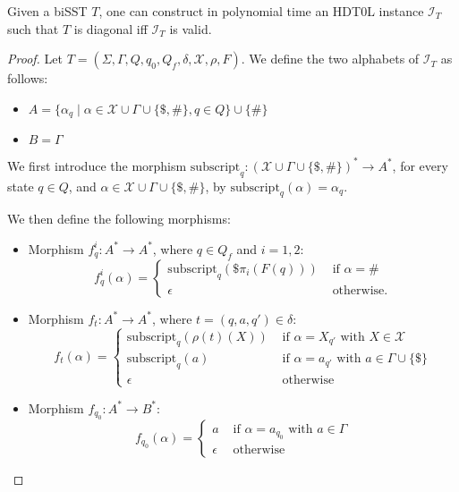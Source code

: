 \documentclass{llncs}
\newcommand{\Vars}{\mathcal{X}}
\begin{document}
\begin{lemma}
    Given a biSST $T$, one can construct in polynomial time an
    HDT0L instance $\mathcal{I}_T$ such that $T$ is diagonal iff 
    $\mathcal{I}_T$ is valid. 
\end{lemma}


\begin{proof}
Let $T = (\Sigma, \Gamma, Q, q_0, Q_f, \delta, \Vars, \rho, F)$. 
We define the two alphabets of $\mathcal{I}_T$ as follows:
\begin{itemize}
\item $A= \{ \alpha_q \mid \alpha\in\mathcal{X}\cup \Gamma \cup \{\$,\#\} , q \in Q\} \cup \{ \#\}$
\item $B=\Gamma$
\end{itemize}

We first introduce the morphism 
$\text{subscript}_q: (\mathcal{X}\cup \Gamma \cup \{\$,\#\})^* \rightarrow A^*$, for every state $q\in Q$,
and $\alpha\in \mathcal{X}\cup \Gamma \cup \{\$,\#\}$, by
$\text{subscript}_q(\alpha)=\alpha_q$.


We then define the following morphisms:
\begin{itemize}
    \item Morphism $f_q^i:A^* \rightarrow A^*$, where $q\in Q_f$ and $i=1,2$:
    $$f_q^i (\alpha) = \left \{
    \begin{array}{ll}
     \text{subscript}_q(\$\pi_i(F(q))) & \text{ if } \alpha= \# \\
     \epsilon                                     & \text{ otherwise.}        
    \end{array}
    \right .        
        $$


    \item Morphism $f_t:A^* \rightarrow A^*$, where $t = (q,a,q')\in\delta$:
    $$f_t(\alpha) = \left \{
    \begin{array}{ll}
     \text{subscript}_q(\rho(t)(X))        & \text{ if }\alpha = X_{q'} \text{ with }X\in \mathcal{X} \\
     \text{subscript}_q(a)                   & \text{ if }\alpha = a_{q'} \text{ with }a\in \Gamma \cup \{\$\} \\
     \epsilon                                        & \text{ otherwise }       
    \end{array}
    \right .        
        $$
\item Morphism $f_{q_0}:A^* \rightarrow B^*$:
    $$f_{q_0}(\alpha) = \left \{
    \begin{array}{ll}
     a              & \text{ if } \alpha = a_{q_0} \text{ with }a\in \Gamma   \\
     \epsilon    & \text{ otherwise}      
    \end{array}
    \right .        
        $$
\end{itemize}


\end{proof}
\end{document}
